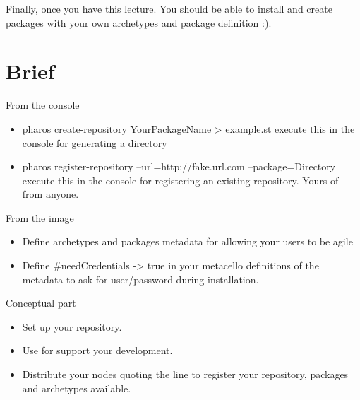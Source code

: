 \documentclass[a4paper,10pt,twoside]{book}
\begin{document}
					Finally, once you have this lecture. You should be able to install and create packages with your own archetypes and package definition :).
				
					
					\section {Brief}
					
					
						From the console 
				
						\begin{itemize}
							\item pharos create-repository YourPackageName > example.st
								\newline\-\- execute this in the console for generating a directory
							\item pharos register-repository --url=http://fake.url.com --package=Directory
								\newline\-\- execute this in the console for registering an existing repository. Yours of from anyone.
						\end{itemize}
				
						From the image 
						
						\begin{itemize}
							\item Define archetypes and packages metadata for allowing your users to be agile
							\item Define \#needCredentials -> true in your metacello definitions of the metadata to ask for user/password during installation.
						\end{itemize}
				
				
						Conceptual part
						
						\begin{itemize}
							\item Set up your repository.
							\item Use \installationTool{} for support your development.
							\item Distribute your nodes quoting the line to register your repository, packages and archetypes available.  
						\end{itemize}
						
						
						
						
				
\end{document}
